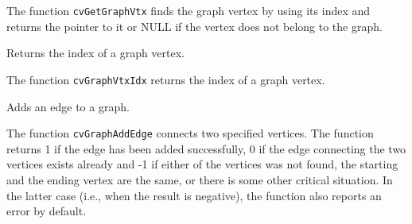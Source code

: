 The function \texttt{cvGetGraphVtx} finds the graph vertex by using its index and returns the pointer to it or NULL if the vertex does not belong to the graph.


\label{GraphVtxIdx}

Returns the index of a graph vertex.


\begin{description}
\end{description}

The function \texttt{cvGraphVtxIdx} returns the index of a graph vertex.

\label{GraphAddEdge}

Adds an edge to a graph.


\begin{description}
\end{description}


The function \texttt{cvGraphAddEdge} connects two specified vertices. The function returns 1 if the edge has been added successfully, 0 if the edge connecting the two vertices exists already and -1 if either of the vertices was not found, the starting and the ending vertex are the same, or there is some other critical situation. In the latter case (i.e., when the result is negative), the function also reports an error by default.

